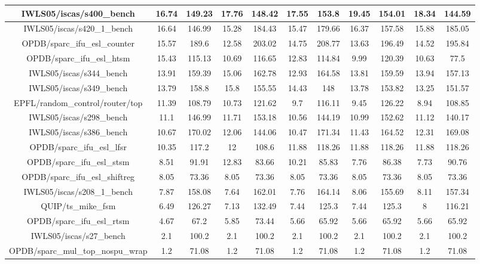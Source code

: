 {\begin{longtable}{|*{11}{c|}}
        \hline
        IWLS05/iscas/s400\_bench & 16.74 & 149.23 & 17.76 & 148.42 & 17.55 & 153.8 & 19.45 & 154.01 & 18.34 & 144.59 \\
        \hline
        IWLS05/iscas/s420\_1\_bench & 16.64 & 146.99 & 15.28 & 184.43 & 15.47 & 179.66 & 16.37 & 157.58 & 15.88 & 185.05 \\
        \hline
        OPDB/sparc\_ifu\_esl\_counter & 15.57 & 189.6 & 12.58 & 203.02 & 14.75 & 208.77 & 13.63 & 196.49 & 14.52 & 195.84 \\
        \hline
        OPDB/sparc\_ifu\_esl\_htsm & 15.43 & 115.13 & 10.69 & 116.65 & 12.83 & 114.84 & 9.99 & 120.39 & 10.63 & 77.5 \\
        \hline
        IWLS05/iscas/s344\_bench & 13.91 & 159.39 & 15.06 & 162.78 & 12.93 & 164.58 & 13.81 & 159.59 & 13.94 & 157.13 \\
        \hline
        IWLS05/iscas/s349\_bench & 13.79 & 158.8 & 15.8 & 155.55 & 14.43 & 148 & 13.78 & 153.82 & 13.25 & 151.57 \\
        \hline
        EPFL/random\_control/router/top & 11.39 & 108.79 & 10.73 & 121.62 & 9.7 & 116.11 & 9.45 & 126.22 & 8.94 & 108.85 \\
        \hline
        IWLS05/iscas/s298\_bench & 11.1 & 146.99 & 11.71 & 153.18 & 10.56 & 144.19 & 10.99 & 152.62 & 11.12 & 140.17 \\
        \hline
        IWLS05/iscas/s386\_bench & 10.67 & 170.02 & 12.06 & 144.06 & 10.47 & 171.34 & 11.43 & 164.52 & 12.31 & 169.08 \\
        \hline
        OPDB/sparc\_ifu\_esl\_lfsr & 10.35 & 117.2 & 12 & 108.6 & 11.88 & 118.26 & 11.88 & 118.26 & 11.88 & 118.26 \\
        \hline
        OPDB/sparc\_ifu\_esl\_stsm & 8.51 & 91.91 & 12.83 & 83.66 & 10.21 & 85.83 & 7.76 & 86.38 & 7.73 & 90.76 \\
        \hline
        OPDB/sparc\_ifu\_esl\_shiftreg & 8.05 & 73.36 & 8.05 & 73.36 & 8.05 & 73.36 & 8.05 & 73.36 & 8.05 & 73.36 \\
        \hline
        IWLS05/iscas/s208\_1\_bench & 7.87 & 158.08 & 7.64 & 162.01 & 7.76 & 164.14 & 8.06 & 155.69 & 8.11 & 157.34 \\
        \hline
        QUIP/ts\_mike\_fsm & 6.49 & 126.27 & 7.13 & 132.49 & 7.44 & 125.3 & 7.44 & 125.3 & 8 & 116.21 \\
        \hline
        OPDB/sparc\_ifu\_esl\_rtsm & 4.67 & 67.2 & 5.85 & 73.44 & 5.66 & 65.92 & 5.66 & 65.92 & 5.66 & 65.92 \\
        \hline
        IWLS05/iscas/s27\_bench & 2.1 & 100.2 & 2.1 & 100.2 & 2.1 & 100.2 & 2.1 & 100.2 & 2.1 & 100.2 \\
        \hline
        OPDB/sparc\_mul\_top\_nospu\_wrap & 1.2 & 71.08 & 1.2 & 71.08 & 1.2 & 71.08 & 1.2 & 71.08 & 1.2 & 71.08 \\
        \hline

\end{longtable}
}

